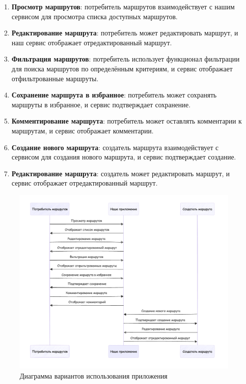 \begin{enumerate}
    \item \textbf{Просмотр маршрутов}: потребитель маршрутов взаимодействует с нашим сервисом для просмотра списка доступных маршрутов.
    \item \textbf{Редактирование маршрута}: потребитель может редактировать маршрут, и наш сервис отображает отредактированный маршрут.
    \item \textbf{Фильтрация маршрутов}: потребитель использует функционал фильтрации для поиска маршрутов по определённым критериям, и сервис отображает отфильтрованные маршруты.
    \item \textbf{Сохранение маршрута в избранное}: потребитель может сохранять маршруты в избранное, и сервис подтверждает сохранение.
    \item \textbf{Комментирование маршрута}: потребитель может оставлять комментарии к маршрутам, и сервис отображает комментарии.
    \item \textbf{Создание нового маршрута}: создатель маршрута взаимодействует с сервисом для создания нового маршрута, и сервис подтверждает создание.
    \item \textbf{Редактирование маршрута}: создатель может редактировать маршрут, и сервис отображает отредактированный маршрут.
\end{enumerate}

\begin{figure}[h!]
    \centering
    \includegraphics[width=1\linewidth]{Images/mobile_logic/диаграмма_вариантов_использования.png}
    \caption{Диаграмма вариантов использования приложения}
    \label{fig:enter-label}
\end{figure}

